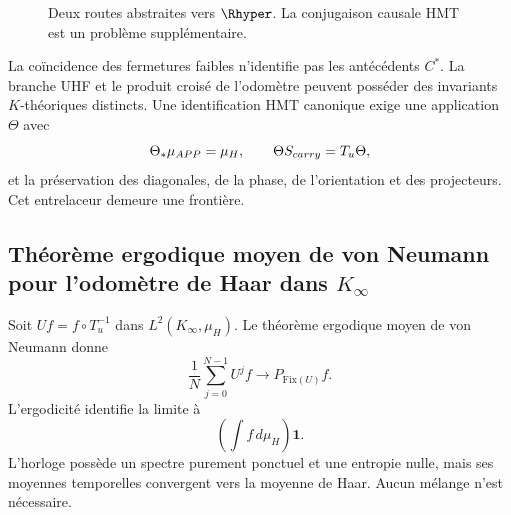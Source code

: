\begin{figure}[H]
\centering
{}
\caption{Deux routes abstraites vers \(\Rhyper\). La conjugaison causale HMT
est un problème supplémentaire.}
\label{p12-83-c21-s3:fig:two-routes-r}
\end{figure}

La coïncidence des fermetures faibles n'identifie pas les antécédents
\(C^*\). La branche UHF et le produit croisé de l'odomètre peuvent posséder
des invariants \(K\)-théoriques distincts. Une identification HMT canonique exige
une application \(\Theta\) avec
\[
  \Theta_*\mu_{\APP}=\mu_H,
  \qquad
  \Theta S_{\rm carry}=T_u\Theta,
\]
et la préservation des diagonales, de la phase, de l'orientation et des projecteurs. Cet
entrelaceur demeure une frontière.

\subsection{Théorème ergodique moyen de von Neumann pour l'odomètre de Haar dans \(K_\infty\)}

Soit \(U f=f\circ T_u^{-1}\) dans \(L^2(K_\infty,\mu_H)\). Le théorème
ergodique moyen de von Neumann \citep{vonneumann1932ergodic} donne
\[
 \frac1N\sum_{j=0}^{N-1}U^jf
 \longrightarrow
 P_{\mathrm{Fix}(U)}f.
\]
L'ergodicité identifie la limite à
\[
  \left(\int f\,d\mu_H\right)\mathbf1.
\]
L'horloge possède un spectre purement ponctuel et une entropie nulle, mais ses moyennes
temporelles convergent vers la moyenne de Haar. Aucun mélange n'est nécessaire.

